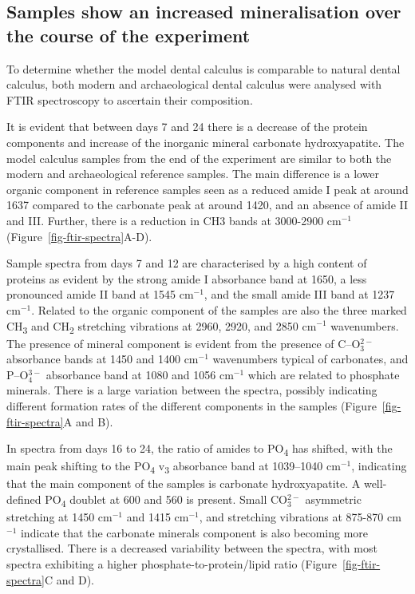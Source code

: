 \documentclass[
  b5paper,
]{book}
\begin{document}
\hypertarget{samples-show-an-increased-mineralisation-over-the-course-of-the-experiment}{%
\subsection{Samples show an increased mineralisation over the course of
the
experiment}\label{samples-show-an-increased-mineralisation-over-the-course-of-the-experiment}}

To determine whether the model dental calculus is comparable to natural
dental calculus, both modern and archaeological dental calculus were
analysed with FTIR spectroscopy to ascertain their composition.

It is evident that between days 7 and 24 there is a decrease of the
protein components and increase of the inorganic mineral carbonate
hydroxyapatite. The model calculus samples from the end of the
experiment are similar to both the modern and archaeological reference
samples. The main difference is a lower organic component in reference
samples seen as a reduced amide I peak at around 1637 compared to the
carbonate peak at around 1420, and an absence of amide II and III.
Further, there is a reduction in CH3 bands at 3000-2900 cm\(^{-1}\)
(Figure~\ref{fig-ftir-spectra}A-D).

Sample spectra from days 7 and 12 are characterised by a high content of
proteins as evident by the strong amide I absorbance band at 1650, a
less pronounced amide II band at 1545 cm\(^{-1}\), and the small amide
III band at 1237 cm\(^{-1}\). Related to the organic component of the
samples are also the three marked CH\textsubscript{3} and
CH\textsubscript{2} stretching vibrations at 2960, 2920, and 2850
cm\(^{-1}\) wavenumbers. The presence of mineral component is evident
from the presence of C--O\(^{2-}_3\) absorbance bands at 1450 and 1400
cm\(^{-1}\) wavenumbers typical of carbonates, and P--O\(^{3-}_4\)
absorbance band at 1080 and 1056 cm\(^{-1}\) which are related to
phosphate minerals. There is a large variation between the spectra,
possibly indicating different formation rates of the different
components in the samples (Figure~\ref{fig-ftir-spectra}A and B).

In spectra from days 16 to 24, the ratio of amides to
PO\textsubscript{4} has shifted, with the main peak shifting to the
PO\textsubscript{4} v\textsubscript{3} absorbance band at 1039--1040
cm\(^{-1}\), indicating that the main component of the samples is
carbonate hydroxyapatite. A well-defined PO\textsubscript{4} doublet at
600 and 560 is present. Small CO\(_3^{2-}\) asymmetric stretching at
1450 cm\(^{-1}\) and 1415 cm\(^{-1}\), and stretching vibrations at
875-870 cm\(^{-1}\) indicate that the carbonate minerals component is
also becoming more crystallised. There is a decreased variability
between the spectra, with most spectra exhibiting a higher
phosphate-to-protein/lipid ratio (Figure~\ref{fig-ftir-spectra}C and D).
\end{document}
